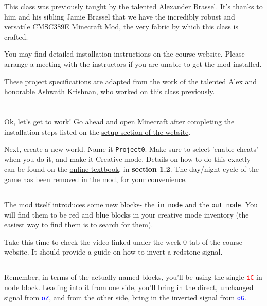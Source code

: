 \documentclass{article}
\begin{document}
This class was previously taught by the talented Alexander Brassel. It's thanks to him and his sibling Jamie Brassel that we have the incredibly robust and versatile CMSC389E Minecraft Mod, the very fabric by which this class is crafted. 

You may find detailed installation instructions on the course website. Please arrange a meeting with the instructors if you are unable to get the mod installed.

These project specifications are adapted from the work of the talented Alex and honorable Ashwath Krishnan, who worked on this class previously.

\section{\selectfont{The First Project!}}

Ok, let's get to work! Go ahead and open Minecraft after completing the installation steps listed on the \href{https://cmsc-389e.github.io/setup.html}{setup section of the website}.

Next, create a new world. Name it \texttt{Project0}. Make sure to select 'enable cheats' when you do it, and make it Creative mode. Details on how to do this exactly can be found on the \href{https://cmsc-389e.github.io/digital-logic-computer-architecture-minecraft/index.html}{online textbook}, in \textbf{section 1.2}. The day/night cycle of the game has been removed in the mod, for your convenience.

\subsection{\selectfont{New Blocks}}

The mod itself introduces some new blocks- the \texttt{in node} and the \texttt{out node}. You will find them to be red and blue blocks in your creative mode inventory (the easiest way to find them is to search for them).

Take this time to check the video linked under the week 0 tab of the course website. It should provide a guide on how to invert a redstone signal.

\subsection{\selectfont{What to Build}}

Remember, in terms of the actually named blocks, you'll be using the single \textcolor{red}{\texttt{iC}} in node block. Leading into it from one side, you'll bring in the direct, unchanged signal from \textcolor{blue}{\texttt{oZ}}, and from the other side, bring in the inverted signal from \textcolor{blue}{\texttt{oG}}. 
\end{document}
